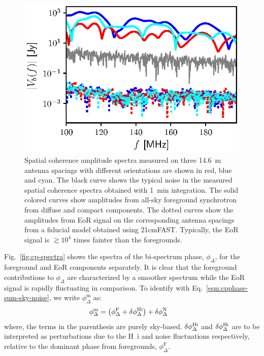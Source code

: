 \documentclass[
reprint,
superscriptaddress,
amsmath,
amssymb,
aps,
prd
]{revtex4-1}
\begin{document}
\begin{figure}[htb]
\includegraphics[width=\linewidth]{visamp_spectra_asm_eor_noise}
\caption{Spatial coherence amplitude spectra measured on three 14.6~m antenna spacings with different orientations are shown in red, blue and cyan. The black curve shows the typical noise in the measured spatial coherence spectra obtained with 1~min integration. The solid colored curves show amplitudes from all-sky foreground synchrotron from diffuse and compact components. The dotted curves show the amplitudes from EoR signal on the corresponding antenna spacings from a fiducial model obtained using 21cmFAST. Typically, the EoR signal is $\gtrsim 10^4$ times fainter than the foregrounds. \label{fig:vis-spectra}}
\end{figure}

Fig.~\ref{fig:cp-spectra} shows the spectra of the bi-spectrum phase, $\phi_\Delta$, for the foreground and EoR components separately. It is clear that the foreground contributions to $\phi_\Delta$ are characterized by a smoother spectrum while the EoR signal is rapidly fluctuating in comparison. To identify with Eq.~\ref{eqn:cpphase-sum-sky-noise}, we write $\phi_\Delta^\textrm{m}$ as:
\begin{align}\label{eqn:cp-components}
  \phi_\Delta^\textrm{m} &= \left(\phi_\Delta^\textrm{F} + \delta\phi_\Delta^\textrm{H{\sc i}}\right) + \delta\phi_\Delta^\textrm{N}
\end{align}
where, the terms in the parenthesis are purely sky-based. $\delta\phi_\Delta^\textrm{H{\sc i}}$ and $\delta\phi_\Delta^\textrm{H{\sc i}}$ are to be interpreted as perturbations due to the H~{\sc i} and noise fluctuations respectively, relative to the dominant phase from foregrounds, $\phi_\Delta^\textrm{F}$.
\end{document}
